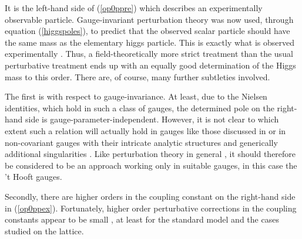 \documentclass[final,12pt,3p,longtitle]{elsarticle}
\newcommand*{\pref}[1]{(\ref{#1})}
\newcommand*{\1}{1\!\!\!\bot}
\begin{document}
It is the left-hand side of \pref{op0ppre} which describes an experimentally observable particle. Gauge-invariant perturbation theory was now used, through equation \pref{higgspoles}, to predict that the observed scalar particle should have the same mass as the elementary higgs particle. This is exactly what is observed experimentally \cite{pdg}. Thus, a field-theoretically more strict treatment than the usual perturbative treatment \cite{Bohm:2001yx} ends up with an equally good determination of the Higgs mass to this order. There are, of course, many further subtleties involved.

The first is with respect to gauge-invariance. At least, due to the Nielsen identities, which hold in such a class of gauges, the determined pole on the right-hand side is gauge-parameter-independent. However, it is not clear to which extent such a relation will actually hold in gauges like those discussed in \cite{Dolan:1974gu} or in non-covariant gauges with their intricate analytic structures and generically additional singularities \cite{Burnel:2008zz}. Like perturbation theory in general \cite{Lee:1974zg}, it should therefore be considered to be an approach working only in suitable gauges, in this case the 't Hooft gauges.

Secondly, there are higher orders in the coupling constant on the right-hand side in \pref{op0ppex}. Fortunately, higher order perturbative corrections in the coupling constants appear to be small \cite{Csikor:1998ui,Maas:2013aia}, at least for the standard model and the cases studied on the lattice.
\end{document}
